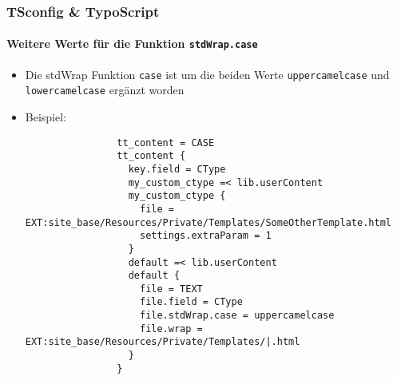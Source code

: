 \begin{frame}[fragile]
	\frametitle{TSconfig \& TypoScript}
	\framesubtitle{Weitere Werte für die Funktion \texttt{stdWrap.case}}

	\lstset{basicstyle=\tiny\ttfamily}

	\begin{itemize}

		\item Die stdWrap Funktion \texttt{case} ist um die beiden Werte
			\texttt{uppercamelcase} und \texttt{lowercamelcase} ergänzt worden

		\item Beispiel:

			\begin{lstlisting}
				tt_content = CASE
				tt_content {
				  key.field = CType
				  my_custom_ctype =< lib.userContent
				  my_custom_ctype {
				    file = EXT:site_base/Resources/Private/Templates/SomeOtherTemplate.html
				    settings.extraParam = 1
				  }
				  default =< lib.userContent
				  default {
				    file = TEXT
				    file.field = CType
				    file.stdWrap.case = uppercamelcase
				    file.wrap = EXT:site_base/Resources/Private/Templates/|.html
				  }
				}
			\end{lstlisting}

	\end{itemize}

\end{frame}


